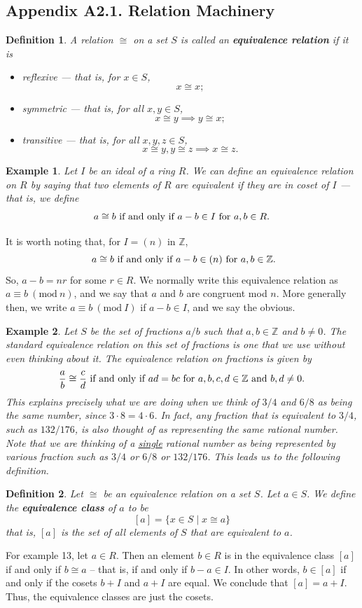 \documentclass[12pt,reqno]{amsart}
\theoremstyle{plain}
\newtheorem{defi}{Definition}
\newtheorem{ex}{Example}
\newcommand{\zz}{\mathbb Z}
\newcommand{\Mod}[1]{\ (\mathrm{mod}\ #1)}
\begin{document}
\subsection{Appendix A2.1. Relation Machinery}
\begin{defi} A relation $\cong$ on a set $S$ is called an \textbf{equivalence relation} if it is
\begin{itemize}
\item[\textup{1}.] reflexive — that is, for $x \in S$,
\[
x \cong x;
\]
\item[$2$.] symmetric — that is, for all $x, y \in S$, 
\[
x \cong y \implies y \cong x;
\]
\item[$3$.] transitive — that is, for all $x, y, z\in S$, 
\[
x \cong y, y \cong z \implies x \cong z.
\]
\end{itemize}
\end{defi} 
\begin{ex} Let $I$ be an ideal of a ring $R$. We can define an equivalence relation on $R$ by saying that two elements of $R$ are equivalent if they are in coset of $I$ — that is, we define
\[
\textup{$a \cong b$ if and only if $a-b \in I$ for $a, b \in R$.}
\]
\end{ex} 
It is worth noting that, for $I = (n)$ in $\zz$,  
\[
\textup{ $a \cong b$ if and only if $a-b \in (n)$ for $a, b \in \zz$.}
\]
So, $a-b=nr$ for some $r \in R$. We normally write this equivalence relation as $a \equiv b \Mod{n}$, and we say that $a$ and $b$ are congruent mod $n$. More generally then, we write $a \equiv b \Mod{I}$ if $a-b \in I$, and we say the obvious. 

\begin{ex}
Let $S$ be the set of fractions $a/b$ such that $a, b \in \zz$ and $b \neq 0$. The standard equivalence relation on this set of fractions is one that we use without even thinking about it. The equivalence relation on fractions is given by
\[
\textup{$\frac{a}{b} \cong \frac{c}{d}$ if and only if $ad = bc$ for $a, b, c, d \in \zz$ and $b,d \neq 0$.}
\]
This explains precisely what we are doing when we think of $3/4$ and $6/8$ as being the same number, since $3 \cdot 8 = 4 \cdot 6$. In fact, any fraction that is equivalent to $3/4$, such as $132/176$, is also thought of as representing the same rational number. Note that we are thinking of a \underline{single} rational number as being represented by various fraction such as $3/4$ or $6/8$ or $132/176$. This leads us to the following definition. 
\end{ex} 
\begin{defi} Let $\cong$ be an equivalence relation on a set $S$. Let $a \in S$. We define the \textbf{equivalence class} of $a$ to be 
\[
[a] = \{ x \in S \mid x \cong a \}
\]
that is, $[a]$ is the set of all elements of $S$ that are equivalent to $a$. 
\end{defi} 
For example 13, let $a \in R$. Then an element $b \in R$ is in the equivalence class $[a]$ if and only if $b \cong a$ – that is, if and only if $b-a \in I$. In other words, $b \in [a]$ if and only if the cosets $b+I$ and $a+I$ are equal. We conclude that $[a] = a+I$. Thus, the equivalence classes are just the cosets. 
\end{document}
